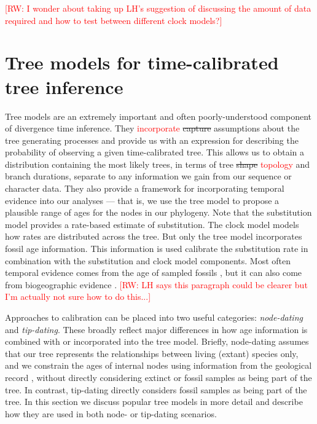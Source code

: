 \documentclass[11pt]{article}
\newcommand{\rw}[1]{{\textcolor{red}{[RW: #1]}}} %
\newcommand{\edit}[1]{{\textcolor{red}{#1}}} %
\begin{document}
\rw{I wonder about taking up LH's suggestion of discussing the amount of data required and how to test between different clock models?}

\section{Tree models for time-calibrated tree inference}


Tree models are an extremely important and often poorly-understood component of divergence time inference. 
They \edit{incorporate} \sout{capture} assumptions about the tree generating processes and provide us with an expression for describing the probability of observing a given time-calibrated tree. This allows us to obtain a distribution containing the most likely trees, in terms of tree \sout{shape} \edit{topology} and branch durations, separate to any information we gain from our sequence or character data.
They also provide a framework for incorporating temporal evidence into our analyses --- that is, we use the tree model to propose a plausible range of ages for the nodes in our phylogeny.
Note that the substitution model provides a rate-based estimate of substitution. The clock model models how rates are distributed across the tree. But only the tree model incorporates fossil age information.
This information is used calibrate the substitution rate in combination with the substitution and clock model components. %
Most often temporal evidence comes from the age of sampled fossils \cite{Parham2012,Heath2014}, but it can also come from biogeographic evidence \cite{deBaets2016,Landis2016}. \rw{LH says this paragraph could be clearer but I'm actually not sure how to do this...}

Approaches to calibration can be placed into two useful categories: \textit{node-dating} and \textit{tip-dating}. 
These broadly reflect major differences in how age information is combined with or incorporated into the tree model.
Briefly, node-dating assumes that our tree represents the relationships between living (extant) species only, and we constrain the ages of internal nodes using information from the geological record%
, without directly considering extinct or fossil samples as being part of the tree.
In contrast, tip-dating directly considers fossil samples as being part of the tree.
In this section we discuss popular tree models in more detail and describe how they are used in both node- or tip-dating scenarios.
\end{document}
